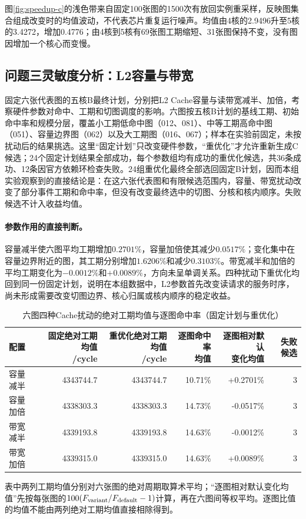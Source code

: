 图\ref{fig:speedup-c}的浅色带来自固定100张图的1500次有放回实例重采样，反映图集合组成改变时的均值波动，不代表芯片重复运行噪声。均值由4核的2.9496升至5核的3.4272，增加0.4776；由4核到5核有69张图工期缩短、31张图保持不变，没有图因增加一个核心而变慢。

\subsection{问题三灵敏度分析：L2容量与带宽}
固定六张代表图的五核B最终计划，分别把L2 Cache容量与读带宽减半、加倍，考察硬件参数对命中、工期和切图调度的影响。六图按五核B计划的基线工期、初始命中率和规模分层，覆盖小工期低命中图（012、081）、中等工期高命中图（051）、容量边界图（062）以及大工期图（016、067）；样本在实验前固定，未按扰动后的结果挑选。这里“固定计划”只改变硬件参数，“重优化”才允许重新生成C候选；24个固定计划结果全部成功，每个参数组均有成功的重优化候选，共36条成功、12条因官方依赖环检查失败。24组重优化最终全部选回固定B计划，因而本组实验观察到的直接结论是：在这六张代表图和有限候选范围内，容量、带宽扰动改变了部分事件工期和命中率，但没有改变最终选中的切图、分核和核内顺序。失败候选不计入收益均值。
\paragraph{参数作用的直接判断。}容量减半使六图平均工期增加$0.2701\%$，容量加倍使其减少$0.0517\%$；变化集中在容量边界附近的图，其工期分别增加$1.6206\%$和减少$0.3103\%$。带宽减半和加倍的平均工期变化为$-0.0012\%$和$+0.0089\%$，方向未呈单调关系。四种扰动下重优化均回到同一份固定计划，说明在本组数据中，L2参数首先改变读请求的服务时序，尚未形成需要改变切图边界、核心归属或核内顺序的稳定收益。
\begin{table}[H]\centering\small\caption{六图四种Cache扰动的绝对工期均值与逐图命中率（固定计划与重优化）}\label{tab:cache-sensitivity}
\begin{tabular}{lrrrrr}\toprule
配置 & \shortstack{固定绝对工期均值\\/cycle} & \shortstack{重优化绝对工期均值\\/cycle} & \shortstack{逐图命中率\\均值} & \shortstack{逐图相对默认\\变化均值} & 失败候选\\\midrule
容量减半 & 4343744.7 & 4343744.7 & 10.71\% & +0.2701\% & 3\\
容量加倍 & 4338303.3 & 4338303.3 & 14.73\% & -0.0517\% & 3\\
带宽减半 & 4339193.8 & 4339193.8 & 14.63\% & -0.0012\% & 3\\
带宽加倍 & 4339315.0 & 4339315.0 & 14.63\% & +0.0089\% & 3\\\bottomrule
\end{tabular}\end{table}
表中两列工期均值分别对六张图的绝对周期取算术平均；“逐图相对默认变化均值”先按每张图的$100(F_{\rm variant}/F_{\rm default}-1)$计算，再在六图间等权平均。逐图比值的均值不能由两列绝对工期均值直接相除得到。

